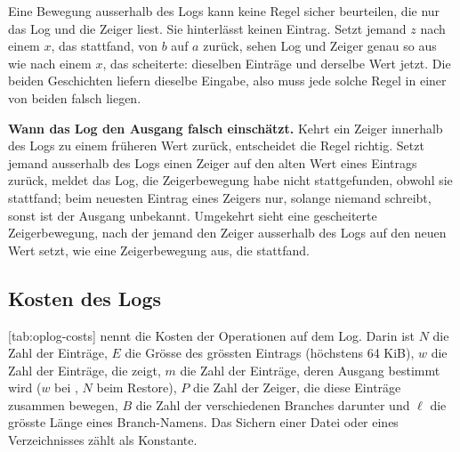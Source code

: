 {Eine Bewegung ausserhalb des Logs kann keine Regel sicher beurteilen,
die nur das Log und die Zeiger liest.
Sie hinterlässt keinen Eintrag.
Setzt jemand $z$ nach einem $x$, das stattfand, von $b$ auf $a$ zurück,
sehen Log und Zeiger genau so aus wie nach einem $x$, das scheiterte:
dieselben Einträge und derselbe Wert jetzt.
Die beiden Geschichten liefern dieselbe Eingabe,
also muss jede solche Regel in einer von beiden falsch liegen.

\startinfobox
{\bf Wann das Log den Ausgang falsch einschätzt.}
Kehrt ein Zeiger innerhalb des Logs zu einem früheren Wert zurück, entscheidet die Regel richtig.
Setzt jemand ausserhalb des Logs einen Zeiger auf den alten Wert eines Eintrags zurück,
meldet das Log, die Zeigerbewegung habe nicht stattgefunden, obwohl sie stattfand;
beim neuesten Eintrag eines Zeigers nur, solange niemand schreibt,
sonst ist der Ausgang unbekannt.
Umgekehrt sieht eine gescheiterte Zeigerbewegung,
nach der jemand den Zeiger ausserhalb des Logs auf den neuen Wert setzt,
wie eine Zeigerbewegung aus, die stattfand.
\stopinfobox

\subsection[sec:oplog-costs]{Kosten des Logs}

[tab:oplog-costs] nennt die Kosten der Operationen auf dem Log.
Darin ist $N$ die Zahl der Einträge, $E$ die Grösse des grössten Eintrags (höchstens 64 KiB),
$w$ die Zahl der Einträge, die  zeigt,
$m$ die Zahl der Einträge, deren Ausgang bestimmt wird
($w$ bei , $N$ beim Restore),
$P$ die Zahl der Zeiger, die diese Einträge zusammen bewegen,
$B$ die Zahl der verschiedenen Branches darunter
und $\ell$ die grösste Länge eines Branch-Namens.
Das Sichern einer Datei oder eines Verzeichnisses zählt als Konstante.

}
